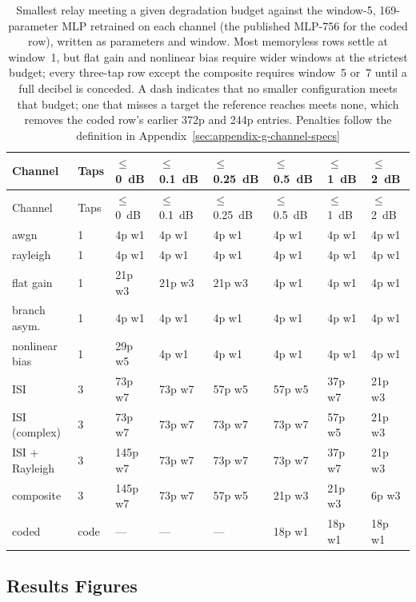 \begin{longtable}[]{@{}llllllll@{}}
\caption[Smallest relay per degradation budget]{Smallest relay meeting a given degradation budget against the window-5, 169-parameter MLP retrained on each channel (the published MLP-756 for the coded row), written as parameters and window. Most memoryless rows settle at window~1, but flat gain and nonlinear bias require wider windows at the strictest budget; every three-tap row except the composite requires window~5 or~7 until a full decibel is conceded. A dash indicates that no smaller configuration meets that budget; one that misses a target the reference reaches meets none, which removes the coded row's earlier 372p and 244p entries. Penalties follow the definition in Appendix~\ref{sec:appendix-g-channel-specs}}\label{tbl:table-minsize}\tabularnewline
\toprule\noalign{}
Channel & Taps & $\le$0~dB & $\le$0.1~dB & $\le$0.25~dB & $\le$0.5~dB & $\le$1~dB & $\le$2~dB \\
\midrule\noalign{}
\endfirsthead
\toprule\noalign{}
Channel & Taps & $\le$0~dB & $\le$0.1~dB & $\le$0.25~dB & $\le$0.5~dB & $\le$1~dB & $\le$2~dB \\
\midrule\noalign{}
\endhead
\bottomrule\noalign{}
\endlastfoot
awgn & 1 & 4p w1 & 4p w1 & 4p w1 & 4p w1 & 4p w1 & 4p w1 \\
rayleigh & 1 & 4p w1 & 4p w1 & 4p w1 & 4p w1 & 4p w1 & 4p w1 \\
flat gain & 1 & 21p w3 & 21p w3 & 21p w3 & 4p w1 & 4p w1 & 4p w1 \\
branch asym. & 1 & 4p w1 & 4p w1 & 4p w1 & 4p w1 & 4p w1 & 4p w1 \\
nonlinear bias & 1 & 29p w5 & 4p w1 & 4p w1 & 4p w1 & 4p w1 & 4p w1 \\
ISI & 3 & 73p w7 & 73p w7 & 57p w5 & 57p w5 & 37p w7 & 21p w3 \\
ISI (complex) & 3 & 73p w7 & 73p w7 & 73p w7 & 73p w7 & 57p w5 & 21p w3 \\
ISI + Rayleigh & 3 & 145p w7 & 73p w7 & 73p w7 & 73p w7 & 37p w7 & 21p w3 \\
composite & 3 & 145p w7 & 73p w7 & 57p w5 & 21p w3 & 21p w3 & 6p w3 \\
coded & code & --- & --- & --- & 18p w1 & 18p w1 & 18p w1 \\
\end{longtable}

\subsection{Results Figures}\label{sec:results-figures-minsize}

